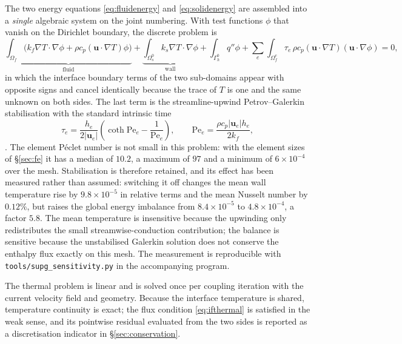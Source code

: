 \documentclass[11pt,a4paper]{article}
\newcommand{\bu}{\mathbf u}
\newcommand{\Om}{\Omega}
\newcommand{\Ga}{\Gamma}
\begin{document}
The two energy equations \eqref{eq:fluidenergy} and \eqref{eq:solidenergy} are
assembled into a \emph{single} algebraic system on the joint numbering. With
test functions $\phi$ that vanish on the Dirichlet boundary, the discrete
problem is
\begin{equation}
\underbrace{\int_{\Om_f}\bigl(k_f\nabla T\cdot\nabla\phi
+\rho c_p(\bu\cdot\nabla T)\phi\bigr)}_{\text{fluid}}
+\underbrace{\int_{\Om_s^0}k_s\nabla T\cdot\nabla\phi}_{\text{wall}}
+\int_{\Ga_h^0}q''\phi
+\sum_{e}\int_{\Om_f^e}\tau_e\,\rho c_p(\bu\cdot\nabla T)(\bu\cdot\nabla\phi)=0,
\label{eq:thermalweak}
\end{equation}
in which the interface boundary terms of the two sub-domains appear with
opposite signs and cancel identically because the trace of $T$ is one and the
same unknown on both sides. The last term is the streamline-upwind
Petrov--Galerkin stabilisation with the standard intrinsic time
\begin{equation}
\tau_e=\frac{h_e}{2|\bu_e|}\left(\coth \mathrm{Pe}_e-\frac{1}{\mathrm{Pe}_e}\right),
\qquad \mathrm{Pe}_e=\frac{\rho c_p|\bu_e|h_e}{2k_f},
\label{eq:supg}
\end{equation}
\citep{brooks1982streamline,hughes1986new}. The element P\'eclet number is
not small in this problem: with the element sizes of
\S\ref{sec:fe} it has a median of $10.2$, a maximum of $97$ and a minimum of
$6\times10^{-4}$ over the mesh. Stabilisation is therefore retained, and its
effect has been measured rather than assumed: switching it off changes the
mean wall temperature rise by $9.8\times10^{-5}$ in relative terms and the
mean Nusselt number by $0.12\%$, but raises the global energy imbalance from
$8.4\times10^{-5}$ to $4.8\times10^{-4}$, a factor $5.8$. The mean temperature
is insensitive because the upwinding only redistributes the small
streamwise-conduction contribution; the balance is sensitive because the
unstabilised Galerkin solution does not conserve the enthalpy flux exactly
on this mesh. The measurement is reproducible with
\texttt{tools/supg\_sensitivity.py} in the accompanying program.

The thermal problem is linear and is solved once per coupling iteration with
the current velocity field and geometry. Because the interface temperature is
shared, temperature continuity is exact; the flux condition
\eqref{eq:ifthermal} is satisfied in the weak sense, and its pointwise
residual evaluated from the two sides is reported as a discretisation
indicator in \S\ref{sec:conservation}.
\end{document}
